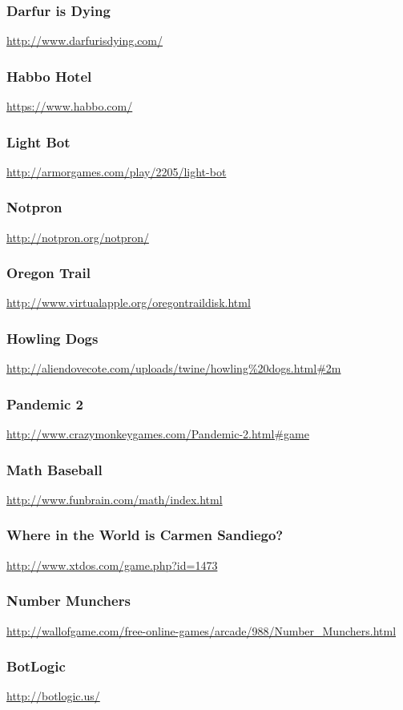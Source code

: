 \subsubsection{Darfur is Dying}\url{http://www.darfurisdying.com/}\subsubsection{Habbo Hotel}\url{https://www.habbo.com/}\subsubsection{Light Bot}\url{http://armorgames.com/play/2205/light-bot}\subsubsection{Notpron}\url{http://notpron.org/notpron/}\subsubsection{Oregon Trail}\url{http://www.virtualapple.org/oregontraildisk.html}\subsubsection{Howling Dogs}\url{http://aliendovecote.com/uploads/twine/howling%20dogs.html#2m}\subsubsection{Pandemic 2}\url{http://www.crazymonkeygames.com/Pandemic-2.html#game}\subsubsection{Math Baseball}\url{http://www.funbrain.com/math/index.html}\subsubsection{Where in the World is Carmen Sandiego?}\url{http://www.xtdos.com/game.php?id=1473}\subsubsection{Number Munchers}\url{http://wallofgame.com/free-online-games/arcade/988/Number_Munchers.html}\subsubsection{BotLogic}\url{http://botlogic.us/}